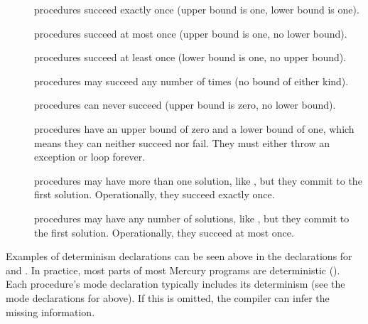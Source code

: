 \begin{description}
    \item[\ddet] procedures succeed exactly once
    (upper bound is one, lower bound is one).
    \item[\dsemidet] procedures succeed at most once
    (upper bound is one, no lower bound).
    \item[\dmulti] procedures succeed at least once
    (lower bound is one, no upper bound).
    \item[\dnondet] procedures may succeed any number of times
    (no bound of either kind).
    \item[\dfailure] procedures can never succeed
    (upper bound is zero, no lower bound).
    \item[\derroneous] procedures have an upper bound of zero and a lower
    bound of one, which means they can neither succeed nor fail.
    They must either throw an exception or loop forever.
    \item[\dccmulti] procedures may have more than one solution, like
    \dmulti,
    but they commit to the first solution.
    Operationally, they succeed exactly once.
    \item[\dccnondet] procedures may have any number of solutions, like
    \dnondet,
    but they commit to the first solution.
    Operationally, they succeed at most once.
\end{description}

\noindent
Examples of determinism declarations can be seen above in the declarations for
 and .
In practice, most parts of most Mercury programs are deterministic (\ddet).
Each procedure's mode declaration
typically includes its determinism (see the mode declarations for
 above).
If this is omitted, the compiler can infer the missing information.


